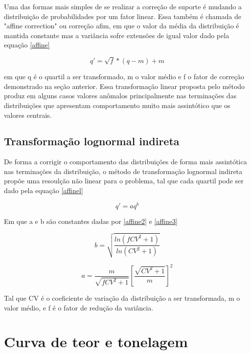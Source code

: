 Uma das formas mais simples de se realizar a correção de suporte é mudando a distribuição de probabilidades por um fator linear. Essa também é chamada de "affine correction" ou correção afim, em que o valor da média da distribuição é mantida constante mas a variância sofre extensões de igual valor dado pela equação  \eqref{affine}

\begin{equation}\label{affine}
q'= \sqrt{f}*(q-m) + m
\end{equation}

em que q é o quartil a ser transformado, m o valor médio e f o fator de correção demonstrado na seção anterior. Essa transformação linear proposta pelo método produz em alguns casos valores anômalos principalmente nas terminações das distribuições que apresentam comportamento muito mais assintótico que os valores centrais. 

\subsection{Transformação lognormal indireta}

De forma a corrigir o comportamento das distribuições de forma mais assintótica nas terminações da distribuição, o método de transformação lognormal indireta propõe uma resoulção não linear para o problema, tal que cada quartil pode ser dado pela equação \eqref{affinel}

\begin{equation}\label{affinel}
q'= aq^{b}
\end{equation}

Em que a e b são constantes dadas por \eqref{affine2} e \eqref{affine3}

\begin{equation}\label{affine2}
b = \sqrt{\frac{ln(fCV^2+1)}{ln(CV^2+1)}}
\end{equation}

\begin{equation}\label{affine3}
a = \frac{m}{\sqrt{f CV^2 + 1}} \left[\frac{\sqrt{CV^2+1}}{m}\right]^2
\end{equation}

Tal que CV é o coeficiente de variação da distribuição a ser transformada, m o valor médio, e f é o fator de redução da variância.

\section{Curva de teor e tonelagem}


